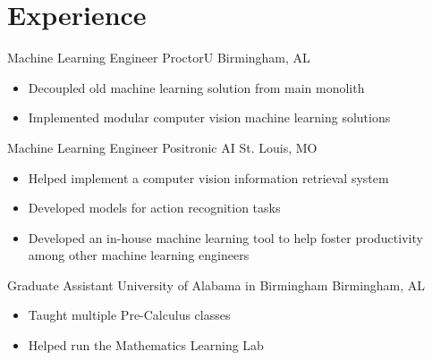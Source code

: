 %
%
% 


\section{Experience}


{Machine Learning Engineer}
{ProctorU}
{Birmingham, AL}{}
{
\begin{itemize}%
\item Decoupled old machine learning solution from main monolith
\item Implemented modular computer vision machine learning solutions
\end{itemize}}


{Machine Learning Engineer}
{Positronic AI}
{St. Louis, MO}{}
{
\begin{itemize}%
\item Helped implement a computer vision information retrieval system
\item Developed models for action recognition tasks
\item Developed an in-house machine learning tool to help foster productivity among other machine learning engineers
\end{itemize}}


{Graduate Assistant}
{University of Alabama in Birmingham}
{Birmingham, AL}{}
{
\begin{itemize}%
\item Taught multiple Pre-Calculus classes
\item Helped run the Mathematics Learning Lab
\end{itemize}}

